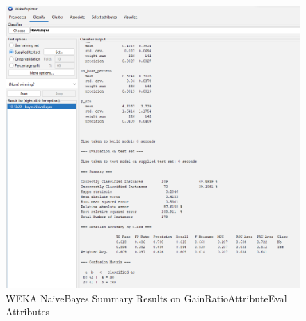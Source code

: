 \documentclass[12pt]{article}
\begin{document}
\begin{figure}[h!]
    \includegraphics[scale=0.4]{./images/GainRatioAttributeEval/NaiveBayes-Summary.png}
\centering
    \caption{WEKA NaiveBayes Summary Results on GainRatioAttributeEval Attributes}
\end{figure}

\newpage
\end{document}

